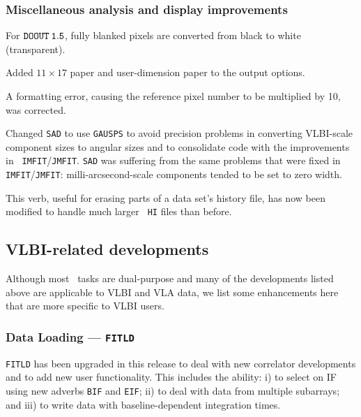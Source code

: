 \subsubsection{Miscellaneous analysis and display improvements}

\begin{description}

 For $\tt DOOUT \> 1.5$, fully blanked pixels are
converted from black to white (transparent).

 Added $11\times 17$ paper and user-dimension paper
to the output options.

 A formatting error, causing the reference pixel number to be multiplied by 10, was corrected.

 Changed {\tt SAD} to use {\tt GAUSPS} to avoid
precision problems in converting VLBI-scale component sizes to angular
sizes and to consolidate code with the improvements in {\tt
IMFIT}/{\tt JMFIT}.  {\tt SAD} was suffering from the same problems
that were fixed in {\tt IMFIT}/{\tt JMFIT}: milli-arcsecond-scale
components tended to be set to zero width.

 This verb, useful for erasing parts of a data
set's history file, has now been modified to handle much larger {\tt
HI} files than before.

\end{description}

\subsection{VLBI-related developments}

Although most \AIPS\ tasks are dual-purpose and many of the
developments listed above are applicable to VLBI and VLA data, we list
some enhancements here that are more specific to VLBI users.

\subsubsection{Data Loading --- {\tt FITLD}}

{\tt FITLD} has been upgraded in this release to deal with new
correlator developments and to add new user functionality. This
includes the ability: i) to select on IF using new adverbs {\tt BIF}
and {\tt EIF}; ii) to deal with data from multiple subarrays; and iii) to
write data with baseline-dependent integration times.

